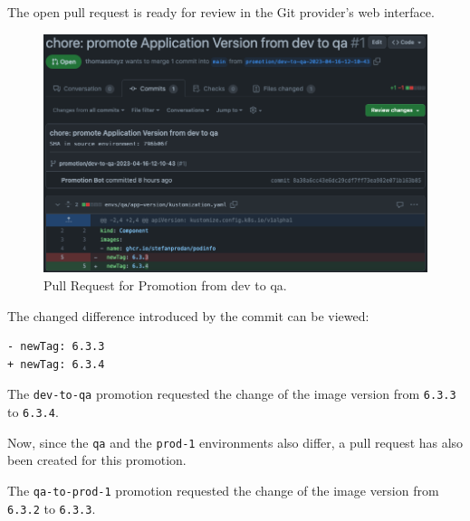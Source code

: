 The open pull request is ready for review in the Git provider's web interface.
\begin{figure}[h]
	\centering
	\includegraphics[width=1.00\linewidth]{assets/prom-pr-dev-to-qa.png}
	\caption{Pull Request for Promotion from dev to qa.
	}
	\label{fig:prom-pr-dev-to-qa}	
\end{figure}

The changed difference introduced by the commit can be viewed:

\begin{lstlisting}
- newTag: 6.3.3
+ newTag: 6.3.4
\end{lstlisting}

The \lstinline|dev-to-qa| promotion requested the change of the image version from
\lstinline|6.3.3| to \lstinline|6.3.4|.

Now, since the \lstinline|qa| and the \lstinline|prod-1| environments
also differ,
a pull request has also been created for this promotion.


The \lstinline|qa-to-prod-1| promotion requested the change of the image version from
\lstinline|6.3.2| to \lstinline|6.3.3|.


